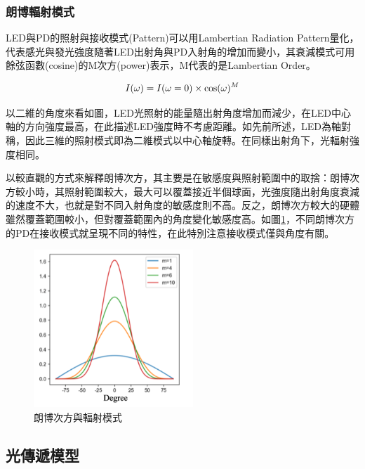         \subsubsection{朗博輻射模式}

        LED與PD的照射與接收模式(Pattern)可以用Lambertian Radiation Pattern量化，代表感光與發光強度隨著LED出射角與PD入射角的增加而變小，其衰減模式可用餘弦函數(cosine)的M次方(power)表示，M代表的是Lambertian Order。

        \begin{equation}
            \label{eqn:lambertian_pattern}
            I(\omega)=I(\omega=0)\times\cos(\omega)^{M}\\
        \end{equation}

        以二維的角度來看如圖，LED光照射的能量隨出射角度增加而減少，在LED中心軸的方向強度最高，在此描述LED強度時不考慮距離。如先前所述，LED為軸對稱，因此三維的照射模式即為二維模式以中心軸旋轉。在同樣出射角下，光輻射強度相同。
        
        

        以較直觀的方式來解釋朗博次方，其主要是在敏感度與照射範圍中的取捨：朗博次方較小時，其照射範圍較大，最大可以覆蓋接近半個球面，光強度隨出射角度衰減的速度不大，也就是對不同入射角度的敏感度則不高。反之，朗博次方較大的硬體雖然覆蓋範圍較小，但對覆蓋範圍內的角度變化敏感度高。如圖\ref{pic:lambertian}，不同朗博次方的PD在接收模式就呈現不同的特性，在此特別注意接收模式僅與角度有關。

        \begin{figure}[ht]
            \centering
            \includegraphics[width=6cm]{ch2pic/lambertian.png}
            \caption{朗博次方與輻射模式}
            \label{pic:lambertian}
        \end{figure}

        

    \subsection{光傳遞模型}

